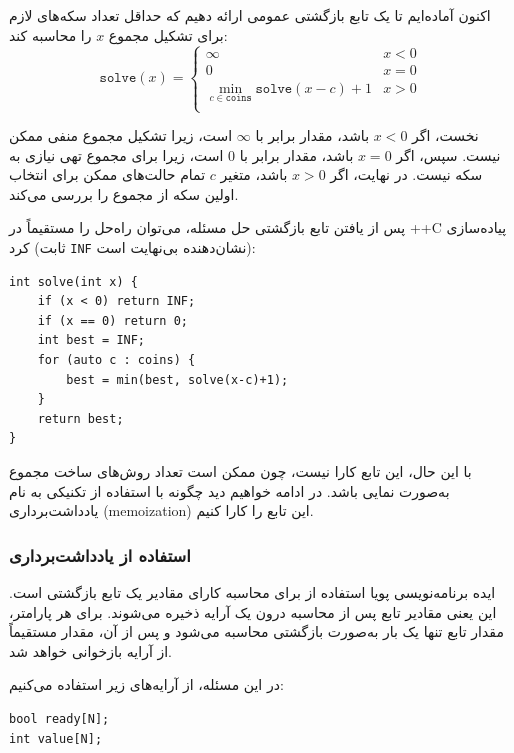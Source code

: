 اکنون آماده‌ایم تا یک تابع بازگشتی عمومی ارائه دهیم
که حداقل تعداد سکه‌های لازم
برای تشکیل مجموع $x$ را محاسبه کند:
\begin{equation*}
    \texttt{solve}(x) = \begin{cases}
               \infty               & x < 0\\
               0               & x = 0\\
               \min_{c \in \texttt{coins}} \texttt{solve}(x-c)+1 & x > 0 \\
           \end{cases}
\end{equation*}

نخست، اگر $x<0$ باشد، مقدار برابر با $\infty$ است،
زیرا تشکیل مجموع منفی ممکن نیست.
سپس، اگر $x=0$ باشد، مقدار برابر با $0$ است،
زیرا برای مجموع تهی نیازی به سکه نیست.
در نهایت، اگر $x>0$ باشد، متغیر $c$ تمام حالت‌های
ممکن برای انتخاب اولین سکه از مجموع را بررسی می‌کند.

پس از یافتن تابع بازگشتی حل مسئله،
می‌توان راه‌حل را مستقیماً در ++C پیاده‌سازی کرد
(ثابت \texttt{INF} نشان‌دهنده بی‌نهایت است):

\begin{lstlisting}
int solve(int x) {
    if (x < 0) return INF;
    if (x == 0) return 0;
    int best = INF;
    for (auto c : coins) {
        best = min(best, solve(x-c)+1);
    }
    return best;
}
\end{lstlisting}

با این حال، این تابع کارا نیست،
چون ممکن است تعداد روش‌های ساخت مجموع
به‌صورت نمایی باشد.
در ادامه خواهیم دید چگونه با استفاده از
تکنیکی به نام یادداشت‌برداری (memoization) این تابع را کارا کنیم.

\subsubsection{استفاده از یادداشت‌برداری}


ایده برنامه‌نویسی پویا استفاده از
 برای محاسبه کارای
مقادیر یک تابع بازگشتی است.
این یعنی مقادیر تابع
پس از محاسبه درون یک آرایه ذخیره می‌شوند.
برای هر پارامتر، مقدار تابع
تنها یک بار به‌صورت بازگشتی محاسبه می‌شود و پس از آن،
مقدار مستقیماً از آرایه بازخوانی خواهد شد.

در این مسئله، از آرایه‌های زیر استفاده می‌کنیم:
\begin{lstlisting}
bool ready[N];
int value[N];
\end{lstlisting}

